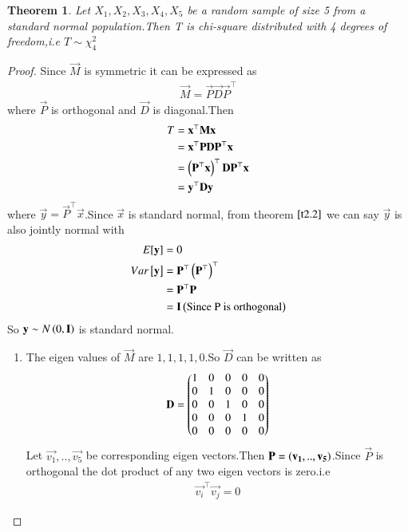 \documentclass[journal,12pt,twocolumn]{IEEEtran}
\newtheorem{theorem}{Theorem}[section]
\begin{document}
\begin{theorem}
Let $X_1,X_2,X_3,X_4,X_5$ be a random sample of size 5 from a standard normal population.Then T is chi-square distributed with 4 degrees of freedom,i.e $T\sim \chi_4^2$
\end{theorem}
\begin{proof}
Since $\vec{M}$ is symmetric it can be expressed as
\begin{align}
    \vec{M}=\vec{P}\vec{D}\vec{P}^{\top}
\end{align}
where $\vec{P}$ is orthogonal and $\vec{D}$ is diagonal.Then
\begin{align}
    T&=\mathbf{x}^{\top}\mathbf{M}\mathbf{x}\\
    &=\mathbf{x}^{\top}\mathbf{P}\mathbf{D}\mathbf{P}^{\top}\mathbf{x}\\
    &=\left(\mathbf{P}^{\top}\mathbf{x}\right)^{\top}\mathbf{D}\mathbf{P}^{\top}\mathbf{x}\\
    &=\mathbf{y}^{\top}\mathbf{D}\mathbf{y}
\end{align}
where $\vec{y}=\vec{P}^{\top}\vec{x}$.Since $\vec{x}$ is standard normal, from theorem $\ref{t2.2}$ we can say $\vec{y}$ is also jointly normal with
\begin{align}
    E[ \mathbf{y} ]&=0\\
    Var{}\left[\mathbf{y}\right]&=\mathbf{P}^{\top}\left(\mathbf{P}^{\top}\right)^{\top}\\
    &=\mathbf{P}^{\top}\mathbf{P}\\
    &=\mathbf{I}  \left(\text{Since P is orthogonal}\right)
\end{align}
So $\mathbf{y}\sim N\left(0,\mathbf{I}\right)$ is standard normal.
\begin{enumerate}
    \item The eigen values of $\vec{M}$ are $1,1,1,1,0$.So $\vec{D}$ can be written as
    \begin{align}
        \mathbf{D}=\begin{pmatrix}1&0&0&0&0\\
                       0&1&0&0&0\\
                       0&0&1&0&0\\
                       0&0&0&1&0\\
                       0&0&0&0&0\end{pmatrix}
    \end{align}
    Let $\vec{v_1},..,\vec{v_5}$ be corresponding eigen vectors.Then  $\mathbf{P}=\left(\mathbf{v_1},..,\mathbf{v_5}\right)$.Since $\vec{P}$ is orthogonal the dot product of any two eigen vectors is zero.i.e
    \begin{align}
        \vec{v_i}^{\top}\vec{v_j}=0 \label{ind}
    \end{align}

\end{enumerate}
\end{proof}
\end{document}
